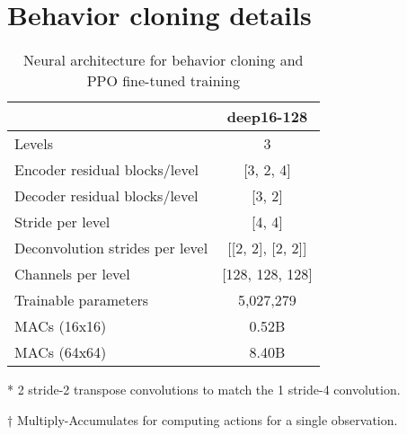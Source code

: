 \documentclass{article}
\begin{document}
\section{Behavior cloning details}
\label{appendix:behavior-cloning-details}
\begin{table}[H]
    \centering
    \begin{threeparttable}
    \caption{Neural architecture for behavior cloning and PPO fine-tuned training}
    \label{tab:bc-architecture}
    \begin{tabular}{lc}
    \toprule
                                 & deep16-128 \\
    \midrule
    Levels                      & 3  \\
    Encoder residual blocks/level & [3, 2, 4] \\
    Decoder residual blocks/level & [3, 2] \\
    Stride per level            & [4, 4] \\
    Deconvolution strides per level & [[2, 2], [2, 2]]\tnote{*}\\
    Channels per level          & [128, 128, 128] \\
    Trainable parameters        & 5,027,279 \\
    MACs\tnote{†} (16x16)          & 0.52B \\
    MACs\tnote{†} (64x64)          & 8.40B \\
    \bottomrule
    \end{tabular}
    \begin{tablenotes}
       \item[*] 2 stride-2 transpose convolutions to match the 1 stride-4 convolution.
       \item[†] Multiply-Accumulates for computing actions for a single observation.
    \end{tablenotes}
    \end{threeparttable}
\end{table}
\end{document}
